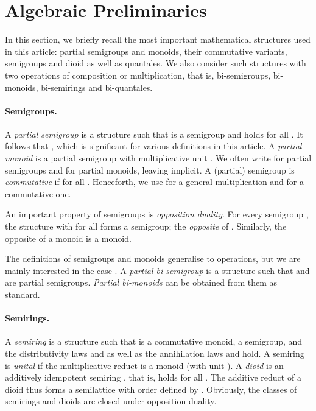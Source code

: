 \documentclass[12pt]{article}
\theoremstyle{definition}
\begin{document}
\section{Algebraic Preliminaries}
\label{sec:algebr-prel}

In this section, we briefly recall the most important mathematical
structures used in this article: partial semigroups and monoids, their
commutative variants, semigroups and dioid as well as quantales. We
also consider such structures with two operations of composition or
multiplication, that is, bi-semigroups, bi-monoids, bi-semirings and
bi-quantales.

\paragraph{Semigroups.}
A \emph{partial semigroup} is a structure  such that
 is a semigroup and 
holds for all .  It follows that , which is
significant for various definitions in this article. A \emph{partial
  monoid} is a partial semigroup with multiplicative unit . We
often write  for partial semigroups and  for
partial monoids, leaving  implicit. A (partial) semigroup  is
\emph{commutative} if  for all . Henceforth, we use  for a general multiplication and 
for a commutative one.

An important property of semigroups is \emph{opposition duality}.  For
every semigroup , the structure  with  for all  forms a semigroup; the \emph{opposite}
of . Similarly, the opposite of a monoid is a monoid.

The definitions of semigroups and monoids generalise to 
operations, but we are mainly interested in the case . A
\emph{partial bi-semigroup} is a structure  such
that  and  are partial semigroups. 
\emph{Partial bi-monoids}  can be obtained from them as
standard.

\paragraph{Semirings.}
A \emph{semiring} is a structure  such that 
is a commutative monoid,  a semigroup, and the
distributivity laws  and  as well as the annihilation laws 
and  hold. A semiring is \emph{unital} if the
multiplicative reduct is a monoid (with unit ). A \emph{dioid} is
an additively idempotent semiring , that is,  holds for all
. The additive reduct of a dioid thus forms a semilattice with
order defined by .  Obviously, the
classes of semirings and dioids are closed under opposition duality.
\end{document}
